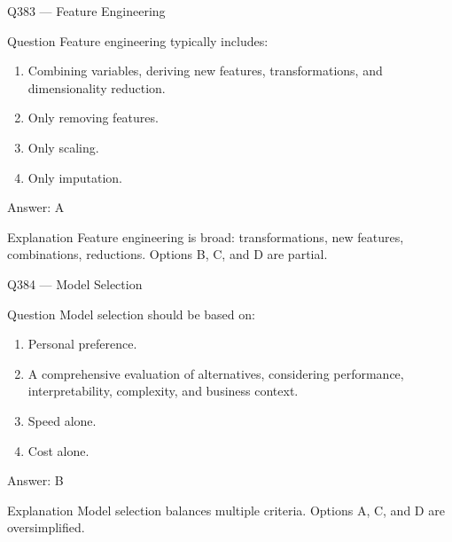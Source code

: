 \documentclass[aspectratio=169,8pt]{beamer}
\begin{document}
	\begin{frame}{Q383 --- Feature Engineering}
		\begin{block}{Question}
			Feature engineering typically includes:
			\begin{enumerate}
				\item Combining variables, deriving new features, transformations, and dimensionality reduction.
				\item Only removing features.
				\item Only scaling.
				\item Only imputation.
			\end{enumerate}
		\end{block}
		\begin{exampleblock}{Answer: A}\end{exampleblock}
		\begin{block}{Explanation}
			Feature engineering is broad: transformations, new features, combinations, reductions. Options B, C, and D are partial.
		\end{block}
	\end{frame}
	
	\begin{frame}{Q384 --- Model Selection}
		\begin{block}{Question}
			Model selection should be based on:
			\begin{enumerate}
				\item Personal preference.
				\item A comprehensive evaluation of alternatives, considering performance, interpretability, complexity, and business context.
				\item Speed alone.
				\item Cost alone.
			\end{enumerate}
		\end{block}
		\begin{exampleblock}{Answer: B}\end{exampleblock}
		\begin{block}{Explanation}
			Model selection balances multiple criteria. Options A, C, and D are oversimplified.
		\end{block}
	\end{frame}
	
\end{document}
